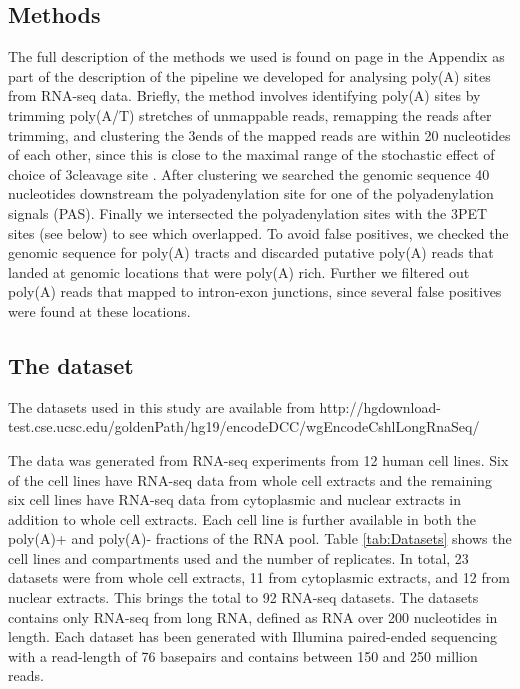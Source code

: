 \subsection{Methods}
The full description of the methods we used is found on page \pageref{utail} in
the Appendix as part of the description of the pipeline we developed for
analysing poly(A) sites from RNA-seq data. Briefly, the method involves
identifying poly(A) sites by trimming poly(A/T) stretches of unmappable reads,
remapping the reads after trimming, and clustering the 3\ppp ends of the mapped
reads are within 20 nucleotides of each other, since this is close to the
maximal range of the stochastic effect of choice of 3\ppp cleavage site
\cite{tian_large-scale_2005}. After clustering we searched the genomic sequence
40 nucleotides downstream the polyadenylation site for one of the
polyadenylation signals (PAS). Finally we intersected the polyadenylation sites
with the 3\ppp PET sites (see below) to see which overlapped. To avoid false
positives, we checked the genomic sequence for poly(A) tracts and discarded
putative poly(A) reads that landed at genomic locations that were poly(A) rich.
Further we filtered out poly(A) reads that mapped to intron-exon junctions,
since several false positives were found at these locations.

\subsection{The dataset}
The datasets used in this study are available from
http://hgdownload-test.cse.ucsc.edu/goldenPath/hg19/encodeDCC/wgEncodeCshlLongRnaSeq/

The data was generated from RNA-seq experiments from 12 human cell lines. Six
of the cell lines have RNA-seq data from whole cell extracts and the remaining
six cell lines have RNA-seq data from cytoplasmic and nuclear extracts in
addition to whole cell extracts. Each cell line is further available in both
the poly(A)+ and poly(A)- fractions of the RNA pool. Table \ref{tab:Datasets}
shows the cell lines and compartments used and the number of replicates. In
total, 23 datasets were from whole cell extracts, 11 from cytoplasmic extracts,
and 12 from nuclear extracts. This brings the total to 92 RNA-seq datasets. The
datasets contains only RNA-seq from long RNA, defined as RNA over 200
nucleotides in length. Each dataset has been generated with Illumina
paired-ended sequencing with a read-length of 76 basepairs and contains between
150 and 250 million reads.

